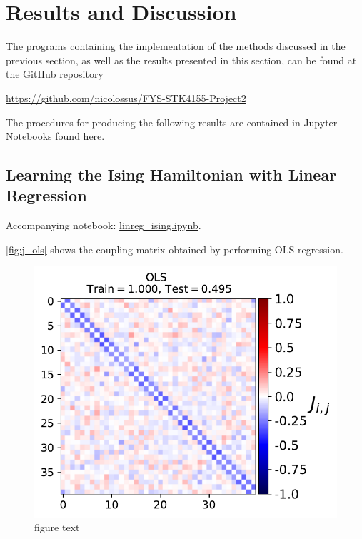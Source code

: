 \section{Results and Discussion}\label{sec:Results}

The programs containing the implementation of the methods discussed in the previous section, as well as the results presented in this section, can be found at the GitHub repository
\begin{center}
    \url{https://github.com/nicolossus/FYS-STK4155-Project2}
\end{center}

The procedures for producing the following results are contained in Jupyter Notebooks found \href{https://github.com/nicolossus/FYS-STK4155-Project2/tree/master/notebooks}{here}.

\subsection{Learning the Ising Hamiltonian with Linear Regression}\label{sec:results linreg}
Accompanying notebook: \href{https://github.com/nicolossus/FYS-STK4155-Project2/blob/master/notebooks/linreg_ising.ipynb}{linreg\_ising.ipynb}.

\autoref{fig:j_ols} shows the coupling matrix obtained by performing OLS regression.

\begin{figure}[H]
\begin{center}\includegraphics[scale=0.6]{latex/figures/ising_J_ols.pdf}
\end{center}
\caption{figure text}
\label{fig:j_ols}
\end{figure}

